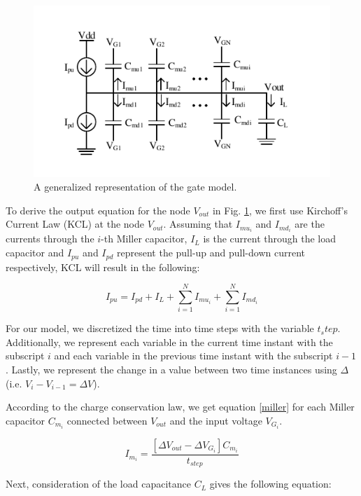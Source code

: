 \begin{figure}[!htbp]
	\centering
	\includegraphics[width=0.75\linewidth]{Figures/GenModel}
	\caption{A generalized representation of the gate model.}
	\label{Gmod}
\end{figure}

To derive the output equation for the node $V_{out}$ in Fig. \ref{Gmod}, we first use Kirchoff’s Current Law (KCL) at the node $V_{out}$. Assuming that $I_{mu_i}$ and $I_{md_i}$ are the currents through the $i$-th Miller capacitor, $I_L$ is the current through the load capacitor and $I_{pu}$ and $I_{pd}$ represent the pull-up and pull-down current respectively, KCL will result in the following:

\begin{equation}\label{KCL}
I_{pu} = I_{pd} + I_L + \sum_{i=1}^{N}I_{mu_i} + \sum_{i=1}^{N}I_{md_i}
\end{equation}

For our model, we discretized the time into time steps with the variable $t_step$. Additionally, we represent each variable in the current time instant with the subscript $i$ and each variable in the previous time instant with the subscript $i-1$. Lastly, we represent the change in a value between two time instances using $\Delta$ (i.e. $V_i-V_{i-1}=\Delta V$). 

According to the charge conservation law, we get equation \ref{miller} for each Miller capacitor $C_{m_i}$ connected between $V_{out}$ and the input voltage $V_{G_i}$.

\begin{equation}\label{miller}
I_{m_i} = \frac{[\Delta V_{out} - \Delta V_{G_i}]C_{m_i}}{t_{step}}
\end{equation}

Next, consideration of the load capacitance $C_L$ gives the following equation:

